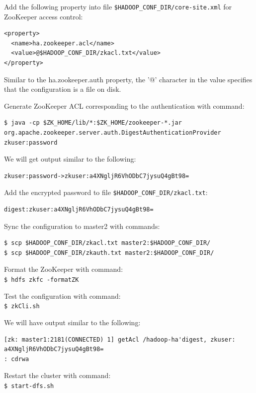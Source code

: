Add the following property into file \verb|$HADOOP_CONF_DIR/core-site.xml| for ZooKeeper access control:
\lstset{style=bashstyle}
\begin{lstlisting}
<property>
  <name>ha.zookeeper.acl</name>
  <value>@$HADOOP_CONF_DIR/zkacl.txt</value>
</property>
\end{lstlisting}

Similar to the ha.zookeeper.auth property, the '@' character in the value specifies that the configuration is a file on disk.

Generate ZooKeeper ACL corresponding to the authentication with command: \\
\lstset{style=bashstyle}
\begin{lstlisting}
$ java -cp $ZK_HOME/lib/*:$ZK_HOME/zookeeper-*.jar org.apache.zookeeper.server.auth.DigestAuthenticationProvider zkuser:password
\end{lstlisting}

We will get output similar to the following:
\lstset{style=bashstyle}
\begin{lstlisting}
zkuser:password->zkuser:a4XNgljR6VhODbC7jysuQ4gBt98=
\end{lstlisting}

Add the encrypted password to file \verb|$HADOOP_CONF_DIR/zkacl.txt|:
\lstset{style=bashstyle}
\begin{lstlisting}
digest:zkuser:a4XNgljR6VhODbC7jysuQ4gBt98=
\end{lstlisting}

Sync the configuration to master2 with commands:
\lstset{style=bashstyle}
\begin{lstlisting}
$ scp $HADOOP_CONF_DIR/zkacl.txt master2:$HADOOP_CONF_DIR/
$ scp $HADOOP_CONF_DIR/zkauth.txt master2:$HADOOP_CONF_DIR/
\end{lstlisting}

Format the ZooKeeper with command: \\
\verb|$ hdfs zkfc -formatZK|

Test the configuration with command: \\
\verb|$ zkCli.sh|

We will have output similar to the following:
\lstset{style=bashstyle}
\begin{lstlisting}
[zk: master1:2181(CONNECTED) 1] getAcl /hadoop-ha'digest, zkuser: a4XNgljR6VhODbC7jysuQ4gBt98=
: cdrwa
\end{lstlisting}

Restart the cluster with command: \\
\verb|$ start-dfs.sh|

